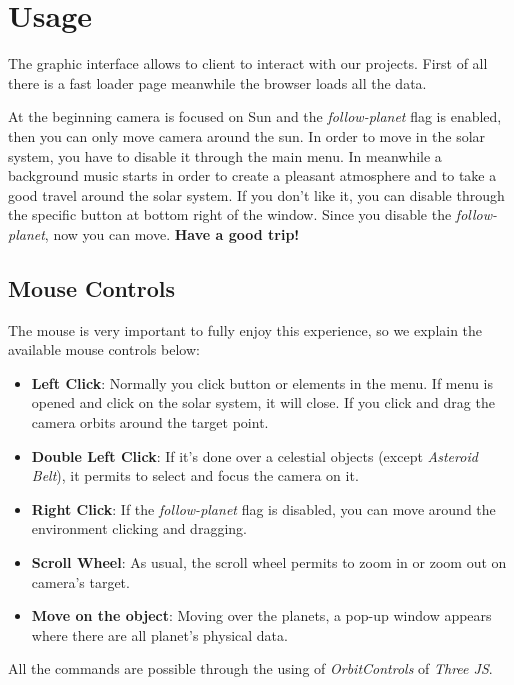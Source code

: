 \documentclass{article}
\begin{document}
\section{Usage}
The graphic interface allows to client to interact with our projects. First of all there is a fast loader page meanwhile the browser loads all the data.\par
At the beginning camera is focused on Sun and the \textit{follow-planet} flag is enabled, then you can only move camera around the sun. In order to move in the solar system, you have to disable it through the main menu.\newline
In meanwhile a background music starts in order to create a pleasant atmosphere and to take a good travel around the solar system. If you don't like it, you can disable through the specific button at bottom right of the window.\newline
Since you disable the \textit{follow-planet}, now you can move.\newline
\textbf{Have a good trip!}

\subsection{Mouse Controls}
The mouse is very important to fully enjoy this experience, so we explain the  available mouse controls below:
\begin{itemize}
	\item \textbf{Left Click}: Normally you click button or elements in the menu. If menu is opened and click on the solar system, it will close. If you click and drag the camera orbits around the target point.
	\item \textbf{Double Left Click}: If it's done over a celestial objects (except \textit{Asteroid Belt}), it permits to select and focus the camera on it.
	\item \textbf{Right Click}: If the \textit{follow-planet} flag is disabled, you can move around the environment clicking and dragging.
	\item \textbf{Scroll Wheel}: As usual, the scroll wheel permits to zoom in or zoom out on camera's target.
	\item \textbf{Move on the object}: Moving over the planets, a pop-up window appears where there are all planet's physical data.
\end{itemize}
All the commands are possible through the using of \textit{OrbitControls} of \textit{Three JS}.
\end{document}

